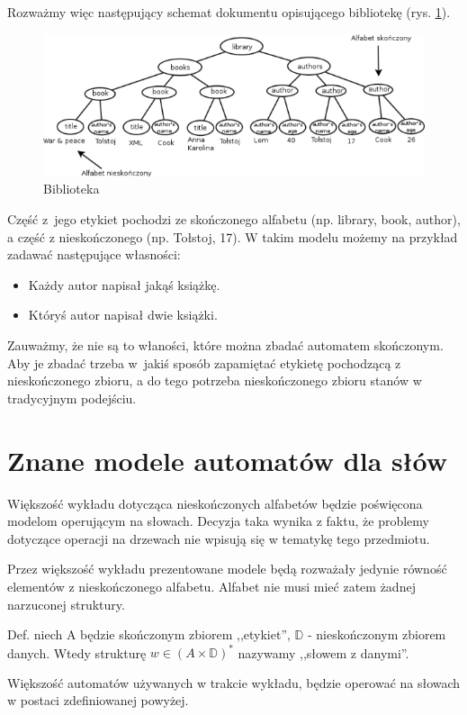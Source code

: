 \documentclass[a4paper,12pt]{report}
\newcommand{\data}{\mathbb D}
\begin{document}
Rozważmy więc następujący schemat dokumentu opisującego bibliotekę (rys. \ref{library}).
\begin{figure}
\begin{center}
\includegraphics{images/library.png}
\end{center}
\caption{Biblioteka}
\label{library}
\end{figure}

Część z~jego etykiet pochodzi ze skończonego alfabetu (np. library, book, author), a część z nieskończonego (np. Tołstoj, 17).
W takim modelu możemy na przykład zadawać następujące własności:
\begin{itemize}
\item Każdy autor napisał jakąś książkę.
\item Któryś autor napisał dwie książki.
\end{itemize}
Zauważmy, że nie są to właności, które można zbadać automatem skończonym. Aby je zbadać trzeba w~jakiś sposób zapamiętać etykietę pochodzącą z nieskończonego zbioru, a do tego potrzeba nieskończonego zbioru stanów w tradycyjnym podejściu.

\section {Znane modele automatów dla słów}

Większość wykładu dotycząca nieskończonych alfabetów będzie poświęcona modelom operującym na słowach. Decyzja taka wynika z faktu, że problemy dotyczące operacji na drzewach nie wpisują się w tematykę tego przedmiotu.

Przez większość wykładu prezentowane modele będą rozważały jedynie równość elementów z nieskończonego alfabetu. Alfabet nie musi mieć zatem żadnej narzuconej struktury.

Def. niech A będzie skończonym zbiorem ,,etykiet'', $\data$ - nieskończonym zbiorem danych. Wtedy strukturę $w \in (A \times \data)^*$ nazywamy ,,słowem z danymi''.

Większość automatów używanych w trakcie wykładu, będzie operować na słowach w postaci zdefiniowanej powyżej.
\end{document}
